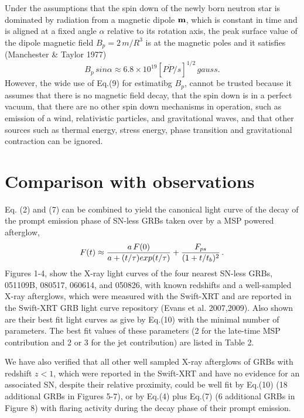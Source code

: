 \documentclass[twocolumn]{aastex61}
\begin{document}
Under the assumptions that the spin down of the newly born 
neutron star is dominated by radiation from a magnetic dipole 
${\bf m}$, which is constant in time and is aligned at a fixed 
angle $\alpha$ relative to its rotation axis, the peak surface 
value of the dipole magnetic field $B_p=2\,m/R^3$ is at the 
magnetic poles and it satisfies (Manchester \& Taylor 1977)
\begin{equation} 
B_p\,sin\alpha \approx 6.8\times 10^{19}[P\dot{P}/s]^{1/2}\, gauss. 
\end{equation} 
However, the wide use of Eq.(9) for  estimatibg $B_p$, cannot be 
trusted  because it assumes that there is no magnetic field 
decay, that the spin down is in a perfect vacuum, that there 
are no other spin down mechanisms in operation, such as emission 
of a wind, relativistic particles, and gravitational waves, 
and that other sources such as thermal
energy, stress energy, phase transition and gravitational 
contraction can be ignored.

\section{Comparison with observations} 
Eq. (2) and (7) can be combined to yield the canonical light curve of 
the decay of the prompt emission phase of SN-less GRBs taken over by 
a MSP powered afterglow,
\begin{equation} 
F(t)\approx {a\, F(0) \over a + (t/\tau) exp(t/\tau)} + 
                {F_{ps}\over (1+t/t_b)^2}\,.
\end{equation}
Figures 1-4, show the X-ray light curves of the four nearest SN-less GRBs, 
051109B, 080517, 060614, and 050826, with known redshifts and a well-sampled 
X-ray afterglows, which were measured with the Swift-XRT and are reported in 
the Swift-XRT GRB light curve repository (Evans et al. 2007,2009). Also shown 
are their best fit light curves as give by Eq.(10) with the minimal number of 
parameters. The best fit values of these parameters (2 for the late-time MSP 
contribution and 2 or 3 for the jet contribution) are listed in Table 2. 

We have also verified that all other well sampled X-ray afterglows of GRBs 
with redshift $z<1$, which were reported in the Swift-XRT and have no 
evidence for an associated SN, despite their relative proximity, could be 
well fit by Eq.(10) (18 additional GRBs in Figures 5-7), or 
by Eq.(4) plus Eq.(7)  (6 additional GRBs in Figure 8) 
with flaring activity during the decay phase of their prompt emission.
\end{document}
